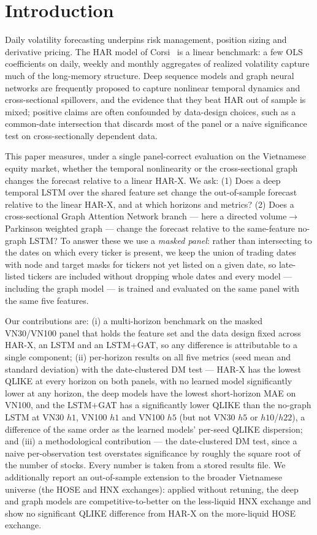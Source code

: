 \documentclass[runningheads]{llncs}
\begin{document}
\section{Introduction}
Daily volatility forecasting underpins risk management, position sizing and derivative pricing. The HAR model
of Corsi~\cite{corsi2009} is a linear benchmark: a few OLS coefficients on daily, weekly and monthly
aggregates of realized volatility capture much of the long-memory structure. Deep sequence models and graph
neural networks are frequently proposed to capture nonlinear temporal dynamics and cross-sectional spillovers,
and the evidence that they beat HAR out of sample is mixed; positive claims are often confounded by
data-design choices, such as a common-date intersection that discards most of the panel or a naive
significance test on cross-sectionally dependent data.

This paper measures, under a single panel-correct evaluation on the Vietnamese equity market, whether the
temporal nonlinearity or the cross-sectional graph changes the forecast relative to a linear HAR-X. We ask: (1)
Does a deep temporal LSTM over the shared feature set change the out-of-sample forecast relative to the linear
HAR-X, and at which horizons and metrics? (2) Does a cross-sectional Graph Attention Network branch --- here a
directed volume$\to$Parkinson weighted graph --- change the forecast relative to the same-feature no-graph
LSTM? To answer these we use a \emph{masked panel}: rather than intersecting to the dates on
which every ticker is present, we keep the union of trading dates with node and target masks for tickers not
yet listed on a given date, so late-listed tickers are included without dropping whole dates and every model
--- including the graph model --- is trained and evaluated on the same panel with the same five features.

Our contributions are: (i) a multi-horizon benchmark on the masked VN30/VN100 panel that holds
the feature set and the data design fixed across HAR-X, an LSTM and an LSTM+GAT, so any difference is
attributable to a single component; (ii) per-horizon results on all five metrics (seed mean and standard
deviation) with the date-clustered DM test --- HAR-X has the lowest QLIKE at every horizon on both panels, with
no learned model significantly lower at any horizon, the deep models have the lowest short-horizon MAE on
VN100, and the LSTM+GAT has a significantly lower QLIKE than the no-graph LSTM at VN30 $h1$, VN100 $h1$ and
VN100 $h5$ (but not VN30 $h5$ or $h10$/$h22$), a difference of the same order as the learned models' per-seed
QLIKE dispersion; and (iii) a methodological contribution --- the
date-clustered DM test, since a naive per-observation test overstates significance by roughly the square root of the number of stocks. Every number is taken from a stored results file.
We additionally report an out-of-sample extension to the broader Vietnamese universe (the HOSE and HNX
exchanges): applied without retuning, the deep and graph models are competitive-to-better on the less-liquid
HNX exchange and show no significant QLIKE difference from HAR-X on the more-liquid HOSE exchange.
\end{document}
